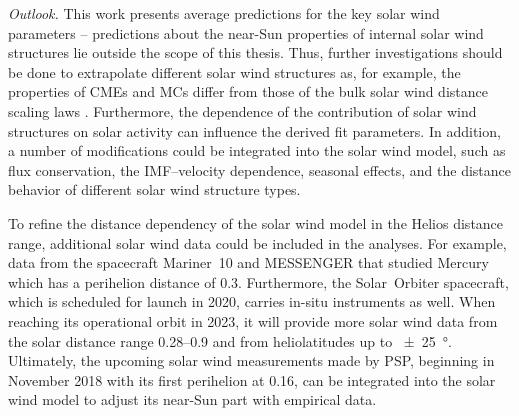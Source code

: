 \bigskip

\noindent \textit{Outlook.}
This work presents average predictions for the key solar wind parameters -- predictions about the near-Sun properties of internal solar wind structures lie outside the scope of this thesis. Thus, further investigations should be done to extrapolate different solar wind structures as, for example, the properties of CMEs and MCs differ from those of the bulk solar wind distance scaling laws \citep{Bothmer1998}. Furthermore, the dependence of the contribution of solar wind structures on solar activity can influence the derived fit parameters.
In addition, a number of modifications could be integrated into the solar wind model, such as flux conservation, the IMF--velocity dependence, seasonal effects, and the distance behavior of different solar wind structure types.

To refine the distance dependency of the solar wind model in the Helios distance range, additional solar wind data could be included in the analyses. For example, data from the spacecraft Mariner~10 and MESSENGER that studied Mercury which has a perihelion distance of \SI{0.3}{\au}.
Furthermore, the Solar~Orbiter spacecraft, which is scheduled for launch in 2020, carries in-situ instruments as well. When reaching its operational orbit in 2023, it will provide more solar wind data from the solar distance range \SIrange{0.28}{0.9}{\au} and from heliolatitudes up to \SI{+-25}{\degree}.
Ultimately, the upcoming solar wind measurements made by PSP, beginning in November 2018 with its first perihelion at \SI{0.16}{\au}, can be integrated into the solar wind model to adjust its near-Sun part with empirical data.




